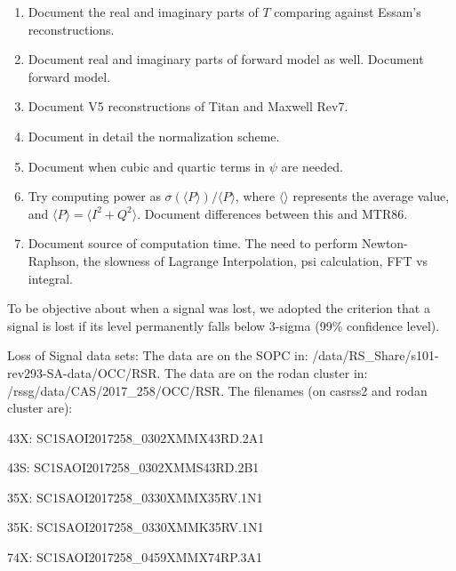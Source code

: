\documentclass[crop=false,class=article,oneside]{standalone}
\begin{document}
\begin{enumerate}
            \item Document the real and imaginary parts of $T$ comparing
                  against Essam's reconstructions.
            \item Document real and imaginary parts of forward
                  model as well. Document forward model.
            \item Document V5 reconstructions of Titan and Maxwell Rev7.
            \item Document in detail the normalization scheme.
            \item Document when cubic and quartic terms in $\psi$ are
                  needed.
            \item Try computing power as
                  $\sigma(\langle{P}\rangle)/\langle{P}\rangle$,
                  where $\langle\rangle$ represents the average value,
                  and $\langle{P}\rangle=\langle{I^{2}+Q^{2}}\rangle$.
                  Document differences between this and MTR86.
            \item Document source of computation time. The need
                  to perform Newton-Raphson, the slowness of
                  Lagrange Interpolation, psi calculation, FFT vs integral.
            
        \end{enumerate}
To be objective about when a signal was lost, we adopted the criterion that a signal is lost if its level permanently falls below 3-sigma (99\% confidence level).
\par
Loss of Signal data sets:
The data are on the SOPC in:
/data/RS\_Share/s101-rev293-SA-data/OCC/RSR. The data are on the rodan cluster in: /rssg/data/CAS/2017\_258/OCC/RSR. The filenames (on casrss2 and rodan cluster are):
\begin{itemize}
\begin{multicols}{2}
    \item 43X: SC1SAOI2017258\_0302XMMX43RD.2A1
    \item 43S: SC1SAOI2017258\_0302XMMS43RD.2B1
    \item 35X: SC1SAOI2017258\_0330XMMX35RV.1N1
    \item 35K: SC1SAOI2017258\_0330XMMK35RV.1N1
    \item 74X: SC1SAOI2017258\_0459XMMX74RP.3A1
\end{multicols}
\end{itemize}
\end{document}
